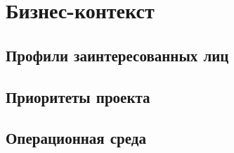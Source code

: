 \chapter{Бизнес-контекст}
\label{ch:chap4}


\section{Профили заинтересованных лиц}
\label{sec:stakeholders}


\section{Приоритеты проекта}
\label{sec:priorities}


\section{Операционная среда}
\label{sec:env}

\endinput
